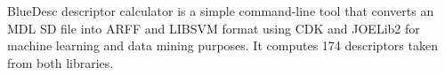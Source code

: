 BlueDesc descriptor calculator is a simple command-line tool that converts an MDL SD file into ARFF and LIBSVM format using CDK and JOELib2 for machine learning and data mining purposes. It computes 174 descriptors taken from both libraries.